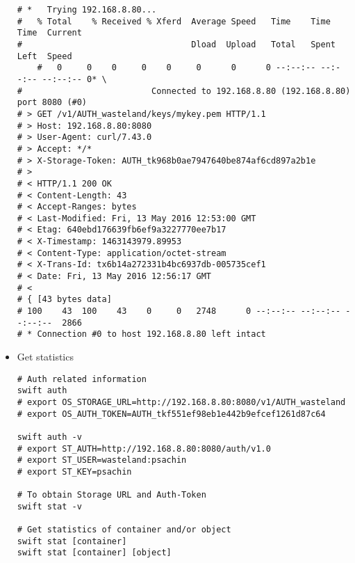 \documentclass{article}
\begin{document}
\begin{itemize}
\begin{verbatim}
# *   Trying 192.168.8.80...
#   % Total    % Received % Xferd  Average Speed   Time    Time     Time  Current
#                                  Dload  Upload   Total   Spent    Left  Speed
    #   0     0    0     0    0     0      0      0 --:--:-- --:--:-- --:--:-- 0* \
#                          Connected to 192.168.8.80 (192.168.8.80) port 8080 (#0)
# > GET /v1/AUTH_wasteland/keys/mykey.pem HTTP/1.1
# > Host: 192.168.8.80:8080
# > User-Agent: curl/7.43.0
# > Accept: */*
# > X-Storage-Token: AUTH_tk968b0ae7947640be874af6cd897a2b1e
# >
# < HTTP/1.1 200 OK
# < Content-Length: 43
# < Accept-Ranges: bytes
# < Last-Modified: Fri, 13 May 2016 12:53:00 GMT
# < Etag: 640ebd176639fb6ef9a3227770ee7b17
# < X-Timestamp: 1463143979.89953
# < Content-Type: application/octet-stream
# < X-Trans-Id: tx6b14a272331b4bc6937db-005735cef1
# < Date: Fri, 13 May 2016 12:56:17 GMT
# <
# { [43 bytes data]
# 100    43  100    43    0     0   2748      0 --:--:-- --:--:-- --:--:--  2866
# * Connection #0 to host 192.168.8.80 left intact
\end{verbatim}

\item Get statistics
\begin{verbatim}
# Auth related information
swift auth
# export OS_STORAGE_URL=http://192.168.8.80:8080/v1/AUTH_wasteland
# export OS_AUTH_TOKEN=AUTH_tkf551ef98eb1e442b9efcef1261d87c64

swift auth -v
# export ST_AUTH=http://192.168.8.80:8080/auth/v1.0
# export ST_USER=wasteland:psachin
# export ST_KEY=psachin

# To obtain Storage URL and Auth-Token
swift stat -v

# Get statistics of container and/or object
swift stat [container]
swift stat [container] [object]


\end{verbatim}
\end{itemize}
\end{document}
